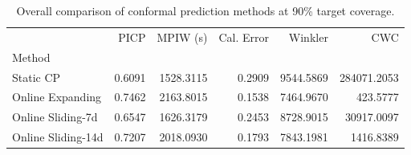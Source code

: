 \begin{table}
\caption{Overall comparison of conformal prediction methods at 90\% target coverage.}
\label{tab:t51_overall_comparison}
\begin{tabular}{lrrrrr}
\toprule
 & PICP & MPIW (s) & Cal. Error & Winkler & CWC \\
Method &  &  &  &  &  \\
\midrule
Static CP & 0.6091 & 1528.3115 & 0.2909 & 9544.5869 & 284071.2053 \\
Online Expanding & 0.7462 & 2163.8015 & 0.1538 & 7464.9670 & 423.5777 \\
Online Sliding-7d & 0.6547 & 1626.3179 & 0.2453 & 8728.9015 & 30917.0097 \\
Online Sliding-14d & 0.7207 & 2018.0930 & 0.1793 & 7843.1981 & 1416.8389 \\
\bottomrule
\end{tabular}
\end{table}
